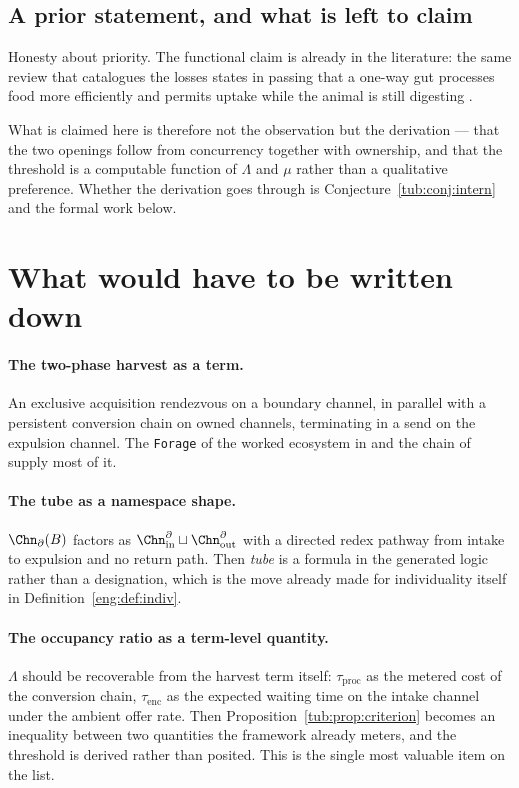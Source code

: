 \subsection{A prior statement, and what is left to claim}

Honesty about priority. The functional claim is already in the literature: the
same review that catalogues the losses states in passing that a one-way gut
processes food more efficiently and permits uptake while the animal is still
digesting \cite{hejnol2015}.

What is claimed here is therefore not the observation but the derivation --- that
the two openings follow from concurrency together with ownership, and that the
threshold is a computable function of $\Lambda$ and $\mu$ rather than a
qualitative preference. Whether the derivation goes through is
Conjecture~\ref{tub:conj:intern} and the formal work below.

\section{What would have to be written down}
\label{tub:sec:formal}

\paragraph{The two-phase harvest as a term.} An exclusive acquisition rendezvous
on a boundary channel, in parallel with a persistent conversion chain on owned
channels, terminating in a send on the expulsion channel. The \texttt{Forage} of
the worked ecosystem in \chSci and the chain of \chEng supply most of it.

\paragraph{The tube as a namespace shape.} $\Chn_{\partial}(B)$ factors as
$\Chn_{\mathrm{in}}^{\partial} \sqcup \Chn_{\mathrm{out}}^{\partial}$ with a
directed redex pathway from intake to expulsion and no return path. Then
\emph{tube} is a formula in the generated logic rather than a designation, which
is the move already made for individuality itself in
Definition~\ref{eng:def:indiv}.

\paragraph{The occupancy ratio as a term-level quantity.} $\Lambda$ should be
recoverable from the harvest term itself: $\tau_{\mathrm{proc}}$ as the metered
cost of the conversion chain, $\tau_{\mathrm{enc}}$ as the expected waiting time
on the intake channel under the ambient offer rate. Then
Proposition~\ref{tub:prop:criterion} becomes an inequality between two
quantities the framework already meters, and the threshold is derived rather
than posited. This is the single most valuable item on the list.

